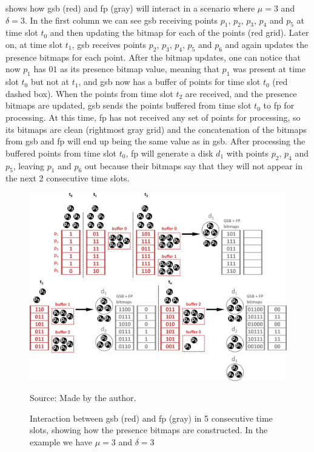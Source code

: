  shows how \ac{gsb} (red) and \ac{fp} (gray) will interact in a scenario where $\mu = 3$ and
$\delta = 3$. In the first column we can see \ac{gsb} receiving points $p_1$, $p_2$, $p_3$, $p_4$ and $p_5$ at time slot
$t_0$ and then updating the bitmap for each of the points (red grid). Later on, at time slot $t_1$, \ac{gsb} receives
points $p_2$, $p_3$, $p_4$, $p_5$ and $p_6$ and again updates the presence bitmaps for each point. After the bitmap
updates, one can notice that now $p_1$ has $01$ as its presence bitmap value, meaning that $p_1$ was present at time
slot $t_0$ but not at $t_1$, and \ac{gsb} now has a buffer of points for time slot $t_0$ (red dashed box). When the
points from time slot $t_2$ are received, and the presence bitmaps are updated, \ac{gsb} sends the points buffered from
time slot $t_0$ to \ac{fp} for processing. At this time, \ac{fp} has not received any set of points for processing, so
its bitmaps are clean (rightmost gray grid) and the concatenation of the bitmaps from \ac{gsb} and \ac{fp} will end up
being the same value as in \ac{gsb}. After processing the buffered points from time slot $t_0$, \ac{fp} will generate a
disk $d_1$ with points $p_2$, $p_4$ and $p_5$, leaving $p_1$ and $p_6$ out because their bitmaps say that they will not
appear in the next 2 consecutive time slots.

\begin{figure}[h!]
    \centering
    \caption{Interaction between \ac{gsb} (red) and \ac{fp} (gray) in 5 consecutive time slots, showing how the presence
        bitmaps are constructed. In the example we have $\mu = 3$ and $\delta = 3$}
    \centerline{\includegraphics[width=\linewidth]{images/gsb_fp_flow.png}}
    \footnotesize{Source: Made by the author.}
    \label{fig:gsb_fp_flow}
\end{figure}

